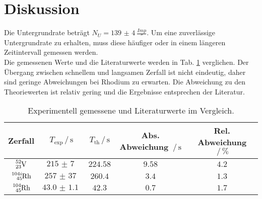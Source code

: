 \section{Diskussion}
\label{sec:Diskussion}
Die Untergrundrate beträgt $N_U = \SI{139(4)}{\frac{Imp}{\second}}$.
Um eine zuverlässige Untergrundrate zu erhalten, muss diese häufiger oder in einem längeren Zeitintervall gemessen werden.
\\
Die gemessenen Werte und die Literaturwerte werden in Tab. \ref{tab:ergebnisse} verglichen.
Der Übergang zwischen schnellem und langsamen Zerfall ist nicht eindeutig, daher sind geringe Abweichungen bei Rhodium zu erwarten.
Die Abweichung zu den Theoriewerten \cite{zerfall} ist relativ gering und die Ergebnisse entsprechen der Literatur.
\begin{table}
    \centering
    \begin{tabular}{c|cccc}
        \toprule
        Zerfall & $T_\text{exp} \,/\, \si{\second}$ & $T_\text{th} \,/\, \si{\second}$ & Abs. Abweichung $\,/\, \si{\second}$ & Rel. Abweichung $\,/\, \si{\percent}$ \\
        \midrule
        $\ce{^{52}_{23}V}$ & $\SI{215(7)}{}$ & $224.58$ & $9.58$ & $4.2$ \\
        $\ce{^{104i}_{45}Rh}$ & $\SI{257(37)}{}$ & $260.4$ & $3.4$ & $1.3$ \\
        $\ce{^{104}_{45}Rh}$ & $\SI{43.0(11)}{}$ & $42.3$ & $0.7$ & $1.7$ \\
        \bottomrule
    \end{tabular}
    \caption{Experimentell gemessene und Literaturwerte \cite{zerfall} im Vergleich.}
    \label{tab:ergebnisse}
\end{table}
